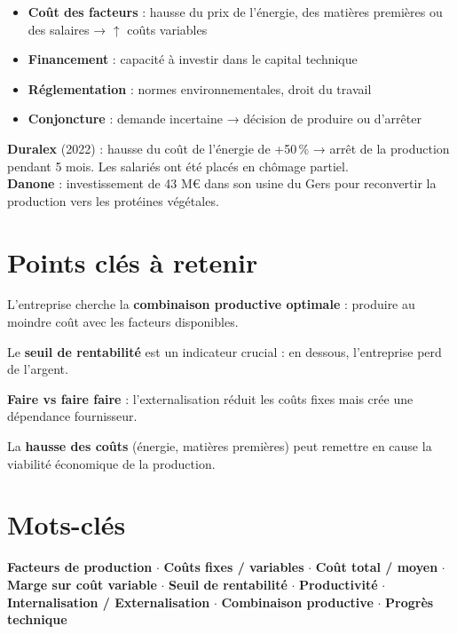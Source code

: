 \documentclass[11pt,a4paper]{article}
\begin{document}
\begin{itemize}
  \item \textbf{Coût des facteurs} : hausse du prix de l'énergie, des matières premières ou des salaires → $\uparrow$ coûts variables
  \item \textbf{Financement} : capacité à investir dans le capital technique
  \item \textbf{Réglementation} : normes environnementales, droit du travail
  \item \textbf{Conjoncture} : demande incertaine → décision de produire ou d'arrêter
\end{itemize}

\begin{exbox}
\textbf{Duralex} (2022) : hausse du coût de l'énergie de +50\,\% → arrêt de la production pendant 5 mois. Les salariés ont été placés en chômage partiel.\\
\textbf{Danone} : investissement de 43 M€ dans son usine du Gers pour reconvertir la production vers les protéines végétales.
\end{exbox}

\section*{Points clés à retenir}

\begin{keybox}
L'entreprise cherche la \textbf{combinaison productive optimale} : produire au moindre coût avec les facteurs disponibles.
\end{keybox}
\vspace{3pt}
\begin{keybox}
Le \textbf{seuil de rentabilité} est un indicateur crucial : en dessous, l'entreprise perd de l'argent.
\end{keybox}
\vspace{3pt}
\begin{keybox}
\textbf{Faire vs faire faire} : l'externalisation réduit les coûts fixes mais crée une dépendance fournisseur.
\end{keybox}
\vspace{3pt}
\begin{keybox}
La \textbf{hausse des coûts} (énergie, matières premières) peut remettre en cause la viabilité économique de la production.
\end{keybox}

\section*{Mots-clés}
\textcolor{mainColor}{\textbf{Facteurs de production}} $\cdot$
\textcolor{mainColor}{\textbf{Coûts fixes / variables}} $\cdot$
\textcolor{mainColor}{\textbf{Coût total / moyen}} $\cdot$
\textcolor{mainColor}{\textbf{Marge sur coût variable}} $\cdot$
\textcolor{mainColor}{\textbf{Seuil de rentabilité}} $\cdot$
\textcolor{mainColor}{\textbf{Productivité}} $\cdot$
\textcolor{mainColor}{\textbf{Internalisation / Externalisation}} $\cdot$
\textcolor{mainColor}{\textbf{Combinaison productive}} $\cdot$
\textcolor{mainColor}{\textbf{Progrès technique}}
\end{document}
